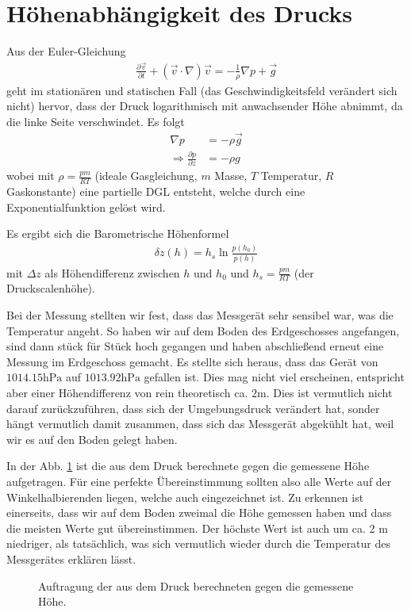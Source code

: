 \documentclass[12pt,a4paper,titlepage,headinclude,bibtotoc]{scrartcl}
\begin{document}
\section{Höhenabhängigkeit des Drucks}
Aus der Euler-Gleichung
\begin{align*}
	\frac{\partial\vec v}{\partial t}+(\vec v\cdot\nabla)\vec v = -\frac{1}{\rho}\nabla p+\vec g
\end{align*}
geht im stationären und statischen Fall (das Geschwindigkeitsfeld verändert sich nicht) hervor, dass der Druck logarithmisch mit anwachsender Höhe abnimmt, da die linke Seite verschwindet.
Es folgt
\begin{align*}
	\nabla p&=-\rho\vec g\\
	\Rightarrow \frac{\partial p}{\partial z}&=-\rho g
\end{align*}
wobei mit $\rho=\frac{pm}{RT}$ (ideale Gasgleichung, $m$ Masse, $T$ Temperatur, $R$ Gaskonstante) eine partielle DGL entsteht, welche durch eine Exponentialfunktion gelöst wird.

Es ergibt sich die Barometrische Höhenformel
\begin{align}
	\delta z(h)=h_s\ln\frac{p(h_0)}{p(h)}
\end{align}
mit $\Delta z$ als Höhendifferenz zwischen $h$ und $h_0$ und $h_s=\frac{pm}{RT}$ (der Druckscalenhöhe).

Bei der Messung stellten wir fest, dass das Messgerät sehr sensibel war, was die Temperatur angeht.
So haben wir auf dem Boden des Erdgeschosses angefangen, sind dann stück für Stück hoch gegangen und haben abschließend erneut eine Messung im Erdgeschoss gemacht.
Es stellte sich heraus, dass das Gerät von $1014.15\si{\hecto\pascal}$ auf $1013.92\si{\hecto\pascal}$ gefallen ist.
Dies mag nicht viel erscheinen, entspricht aber einer Höhendifferenz von rein theoretisch ca. $2\si\meter$.
Dies ist vermutlich nicht darauf zurückzuführen, dass sich der Umgebungsdruck verändert hat, sonder hängt vermutlich damit zusammen, dass sich das Messgerät abgekühlt hat, weil wir es auf den Boden gelegt haben.

In der Abb. \ref{fig:hoehe} ist die aus dem Druck berechnete gegen die gemessene Höhe aufgetragen.
Für eine perfekte Übereinstimmung sollten also alle Werte auf der Winkelhalbierenden liegen, welche auch eingezeichnet ist.
Zu erkennen ist einerseits, dass wir auf dem Boden zweimal die Höhe gemessen haben und dass die meisten Werte gut übereinstimmen.
Der höchste Wert ist auch um ca. 2 m niedriger, als tatsächlich, was sich vermutlich wieder durch die Temperatur des Messgerätes erklären lässt.


\begin{figure}[h]
	\centering
	
	\caption{Auftragung der aus dem Druck berechneten gegen die gemessene Höhe.}
	\label{fig:hoehe}
\end{figure}
\end{document}
